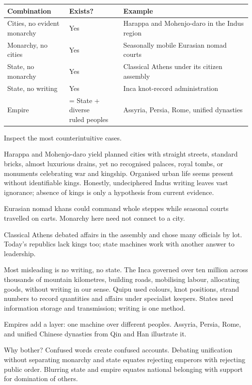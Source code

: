 \noindent
\begin{tabularx}{\linewidth}{llX}
\toprule
Combination & Exists? & Example \\
\midrule
\shortstack[l]{Cities, no evident\\ monarchy} & Yes & Harappa and Mohenjo-daro in the Indus region \\
Monarchy, no cities & Yes & Seasonally mobile Eurasian nomad courts \\
State, no monarchy & Yes & Classical Athens under its citizen assembly \\
State, no writing & Yes & Inca knot-record administration \\
Empire & \shortstack[l]{= State + diverse\\ ruled peoples} & Assyria, Persia, Rome, unified dynasties \\
\bottomrule
\end{tabularx}

\smallskip
Inspect the most counterintuitive cases.

Harappa and Mohenjo-daro yield planned cities with straight streets, standard bricks, almost luxurious drains, yet no recognised palaces, royal tombs, or monuments celebrating war and kingship. Organised urban life seems present without identifiable kings. Honestly, undeciphered Indus writing leaves vast ignorance; absence of kings is only a hypothesis from current evidence.

Eurasian nomad khans could command whole steppes while seasonal courts travelled on carts. Monarchy here need not connect to a city.

Classical Athens debated affairs in the assembly and chose many officials by lot. Today's republics lack kings too; state machines work with another answer to leadership.

Most misleading is no writing, no state. The Inca governed over ten million across thousands of mountain kilometres, building roads, mobilising labour, allocating goods, without writing in our sense. Quipu used colours, knot positions, strand numbers to record quantities and affairs under specialist keepers. States need information storage and transmission; writing is one method.

Empires add a layer: one machine over different peoples. Assyria, Persia, Rome, and unified Chinese dynasties from Qin and Han illustrate it.

Why bother? Confused words create confused accounts. Debating unification without separating monarchy and state equates rejecting emperors with rejecting public order. Blurring state and empire equates national belonging with support for domination of others.

